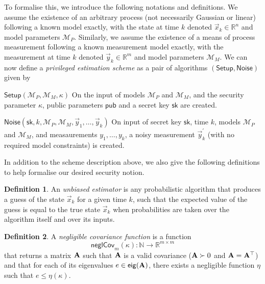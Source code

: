 \documentclass[letterpaper, 10 pt, conference]{IEEEtran}
\theoremstyle{definition}
\newtheorem{definition}{Definition}[section]
\begin{document}
To formalise this, we introduce the following notations and definitions. We assume the existence of an arbitrary process (not necessarily Gaussian or linear) following a known model exactly, with the state at time $k$ denoted $\vec{x}_k\in\mathbb{R}^n$ and model parameters $\mathcal{M}_P$. Similarly, we assume the existence of a means of process measurement following a known measurement model exactly, with the measurement at time $k$ denoted $\vec{y}_k\in\mathbb{R}^m$ and model parameters $\mathcal{M}_M$. We can now define a \textit{privileged estimation scheme} as a pair of algorithms $(\mathsf{Setup},\mathsf{Noise})$ given by
\begin{LaTeXdescription}
   \item[$\mathsf{Setup}(\mathcal{M}_P, \mathcal{M}_M, \kappa)$] On the input of models $\mathcal{M}_P$ and $\mathcal{M}_M$, and the security parameter $\kappa$, public parameters $\mathsf{pub}$ and a secret key $\mathsf{sk}$ are created.
   \item[$\mathsf{Noise}(\mathsf{sk}, k, \mathcal{M}_P, \mathcal{M}_M, \vec{y}_1, \dots, \vec{y}_k)$] On input of secret key $\mathsf{sk}$, time $k$, models $\mathcal{M}_P$ and $\mathcal{M}_M$, and measaurements $y_1,\dots,y_k$, a noisy measurement $\vec{y}^\prime_k$ (with no required model constraints) is created.
\end{LaTeXdescription}
In addition to the scheme description above, we also give the following definitions to help formalise our desired security notion.
\begin{definition}\label{def:estimator}
   An \textit{unbiased estimator} is any probabilistic algorithm that produces a guess of the state $\vec{x}_k$ for a given time $k$, such that the expected value of the guess is equal to the true state $\vec{x}_k$ when probabilities are taken over the algorithm itself and over its inputs.
\end{definition}
\begin{definition}
   A \textit{negligible covariance function} is a function 
   \begin{equation}
      \mathsf{neglCov}_m(\kappa):\mathbb{N}\rightarrow \mathbb{R}^{m\times m}
   \end{equation}
   that returns a matrix ${{\mathbf{A}}}$ such that ${{\mathbf{A}}}$ is a valid covariance (${{\mathbf{A}}}\succ 0$ and ${{\mathbf{A}}}={{\mathbf{A}}}^\top$) and that for each of its eigenvalues $e\in\mathsf{eig}({{\mathbf{A}}})$, there exists a negligible function $\eta$ such that $e\leq\eta(\kappa)$.
\end{definition}
\end{document}
